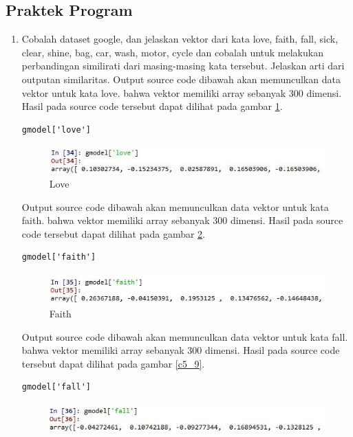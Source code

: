 \subsection{Praktek Program}
\begin{enumerate}
\item Cobalah dataset google, dan jelaskan vektor dari kata love, faith, fall, sick, clear, shine, bag, car, wash, motor, cycle dan cobalah untuk melakukan perbandingan similirati dari masing-masing kata tersebut. Jelaskan arti dari outputan similaritas.
\subitem Output source code dibawah akan memunculkan data vektor untuk kata love. bahwa vektor memiliki array sebanyak 300 dimensi. Hasil pada source code tersebut dapat dilihat pada gambar \ref{c5_7}.
\begin{verbatim}
gmodel['love']
\end{verbatim}
\begin{figure}[!htbp]
	\centerline{\includegraphics[width=1\textwidth]{figures/huda/chapter5/7.JPG}}
	\caption{Love}
	\label{c5_7}
\end{figure}
\subitem Output source code dibawah akan memunculkan data vektor untuk kata faith. bahwa vektor memiliki array sebanyak 300 dimensi. Hasil pada source code tersebut dapat dilihat pada gambar \ref{c5_8}.
\begin{verbatim}
gmodel['faith']
\end{verbatim}
\begin{figure}[!htbp]
	\centerline{\includegraphics[width=1\textwidth]{figures/huda/chapter5/8.JPG}}
	\caption{Faith}
	\label{c5_8}
\end{figure}
\subitem Output source code dibawah akan memunculkan data vektor untuk kata fall. bahwa vektor memiliki array sebanyak 300 dimensi. Hasil pada source code tersebut dapat dilihat pada gambar \ref{c5_9}.
\begin{verbatim}
gmodel['fall']
\end{verbatim}
\begin{figure}[!htbp]
	\centerline{\includegraphics[width=1\textwidth]{figures/huda/chapter5/9.JPG}}

\end{figure}
\end{enumerate}

